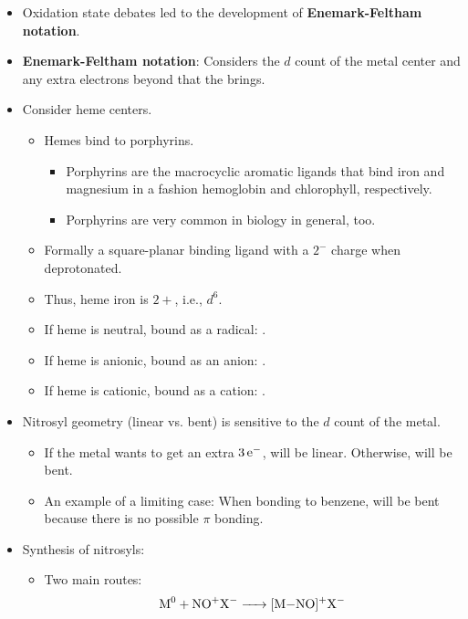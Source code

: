 \documentclass[../notes.tex]{subfiles}
\begin{document}
\begin{itemize}
    \item Oxidation state debates led to the development of \textbf{Enemark-Feltham notation}.
    \item \textbf{Enemark-Feltham notation}: Considers the $d$ count of the metal center and any extra electrons beyond  that the  brings.
    \item Consider heme centers.
    \begin{itemize}
        \item Hemes bind to porphyrins.
        \begin{itemize}
            \item Porphyrins are the macrocyclic aromatic ligands that bind iron and magnesium in a fashion hemoglobin and chlorophyll, respectively.
            \item Porphyrins are very common in biology in general, too.
        \end{itemize}
        \item Formally a square-planar binding ligand with a $2^-$ charge when deprotonated.
        \item Thus, heme iron is $2+$, i.e., $d^6$.
        \item If heme  is neutral,  bound as a radical: .
        \item If heme  is anionic,  bound as an anion: .
        \item If heme  is cationic,  bound as a cation: .
    \end{itemize}
    \item Nitrosyl geometry (linear vs. bent) is sensitive to the $d$ count of the metal.
    \begin{itemize}
        \item If the metal wants to get an extra $3\,\e[-]$,  will be linear. Otherwise,  will be bent. 
        \item An example of a limiting case: When bonding to benzene,  will be bent because there is no possible $\pi$ bonding.
    \end{itemize}
    \item Synthesis of nitrosyls:
    \begin{itemize}
        \item Two main routes:
        \begin{gather*}
            \ce{M^0 + NO+X- -> [M-NO]+X-}\\

\end{gather*}
\end{itemize}
\end{itemize}
\end{document}
